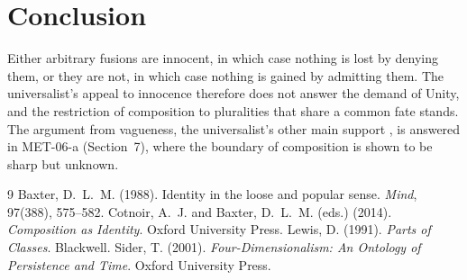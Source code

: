 \documentclass{situationist-preprint}
\begin{document}
\section{Conclusion}

Either arbitrary fusions are innocent, in which case nothing is lost by denying them, or they are not, in which case nothing is gained by admitting them. The universalist's appeal to innocence therefore does not answer the demand of Unity, and the restriction of composition to pluralities that share a common fate stands. The argument from vagueness, the universalist's other main support \citep{Sider2001}, is answered in MET-06-a (Section~7), where the boundary of composition is shown to be sharp but unknown.

\begin{thebibliography}{9}\small
{} Baxter, D.~L.~M. (1988). Identity in the loose and popular sense. \emph{Mind}, 97(388), 575--582.
 Cotnoir, A.~J. and Baxter, D.~L.~M. (eds.) (2014). \emph{Composition as Identity}. Oxford University Press.
 Lewis, D. (1991). \emph{Parts of Classes}. Blackwell.
 Sider, T. (2001). \emph{Four-Dimensionalism: An Ontology of Persistence and Time}. Oxford University Press.
\end{thebibliography}
\end{document}
